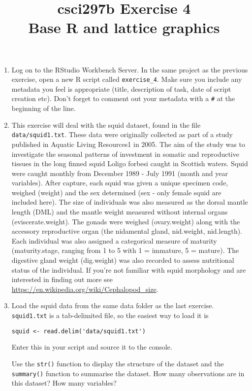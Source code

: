 \documentclass[12pt]{article}
\title{csci297b Exercise 4\\Base R and lattice graphics
  }
\date{}
\newcommand{\lst}[1]{\lstinline{#1}}
\begin{document}
\maketitle

\begin{enumerate}

\item Log on to the RStudio Workbench Server. 
In the same project as the previous exercise, open a new R script called 
\verb|exercise_4|.
Make sure you include any metadata you feel is appropriate (title, description of task, date of script creation etc). Don’t forget to comment out your metadata with a \lstinline{#} at the beginning of the line.


 
\item  This exercise will deal with the squid dataset, found in the file \verb|data/squid1.txt|.
 These data were originally collected as part of a study published in Aquatic Living Resources1 in 2005. The aim of the study was to investigate the seasonal patterns of investment in somatic and reproductive tissues in the long finned squid Loligo forbesi caught in Scottish waters. Squid were caught monthly from December 1989 - July 1991 (month and year variables). After capture, each squid was given a unique specimen code, weighed (weight) and the sex determined (sex - only female squid are included here). The size of individuals was also measured as the dorsal mantle length (DML) and the mantle weight measured without internal organs (eviscerate.weight). The gonads were weighed (ovary.weight) along with the accessory reproductive organ (the nidamental gland, nid.weight, nid.length). Each individual was also assigned a categorical measure of maturity (maturity.stage, ranging from 1 to 5 with 1 = immature, 5 = mature). The digestive gland weight (dig.weight) was also recorded to assess nutritional status of the individual. If you’re not familiar with squid morphology and are interested in finding out more see 
\url{https://en.wikipedia.org/wiki/Cephalopod_size}.

 
\item Load the squid data from the same data folder as the last exercise.  \verb|squid1.txt|
is a tab-delimited file, so the easiest way to load it is
\begin{lstlisting}
squid <- read.delim('data/squid1.txt')
\end{lstlisting}
Enter this in your script and source it to the console.
 
  Use the \lst{str()} function to display the structure of the dataset and the \lst{summary()} function to summarise the dataset. How many observations are in this dataset? How many variables? 
  

\end{enumerate}
\end{document}
